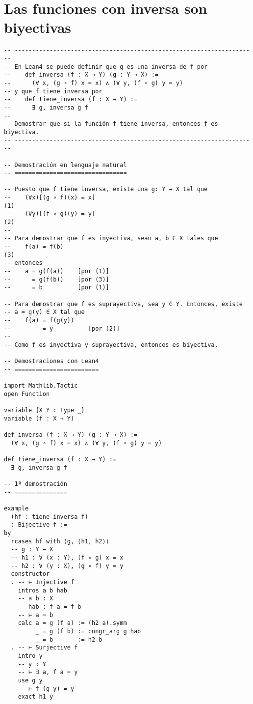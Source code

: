 \section{Las funciones con inversa son biyectivas}
\label{sec:orgbb6a3a1}
\begin{verbatim}
-- ---------------------------------------------------------------------
-- En Lean4 se puede definir que g es una inversa de f por
--    def inversa (f : X → Y) (g : Y → X) :=
--      (∀ x, (g ∘ f) x = x) ∧ (∀ y, (f ∘ g) y = y)
-- y que f tiene inversa por
--    def tiene_inversa (f : X → Y) :=
--      ∃ g, inversa g f
--
-- Demostrar que si la función f tiene inversa, entonces f es biyectiva.
-- ---------------------------------------------------------------------

-- Demostración en lenguaje natural
-- ================================

-- Puesto que f tiene inversa, existe una g: Y → X tal que
--    (∀x)[(g ∘ f)(x) = x]                                           (1)
--    (∀y)[(f ∘ g)(y) = y]                                           (2)
--
-- Para demostrar que f es inyectiva, sean a, b ∈ X tales que
--    f(a) = f(b)                                                    (3)
-- entonces
--    a = g(f(a))    [por (1)]
--      = g(f(b))    [por (3)]
--      = b          [por (1)]
--
-- Para demostrar que f es suprayectiva, sea y ∈ Y. Entonces, existe
-- a = g(y) ∈ X tal que
--    f(a) = f(g(y))
--         = y          [por (2)]
--
-- Como f es inyectiva y suprayectiva, entonces es biyectiva.

-- Demostraciones con Lean4
-- ========================

import Mathlib.Tactic
open Function

variable {X Y : Type _}
variable (f : X → Y)

def inversa (f : X → Y) (g : Y → X) :=
  (∀ x, (g ∘ f) x = x) ∧ (∀ y, (f ∘ g) y = y)

def tiene_inversa (f : X → Y) :=
  ∃ g, inversa g f

-- 1ª demostración
-- ===============

example
  (hf : tiene_inversa f)
  : Bijective f :=
by
  rcases hf with ⟨g, ⟨h1, h2⟩⟩
  -- g : Y → X
  -- h1 : ∀ (x : Y), (f ∘ g) x = x
  -- h2 : ∀ (y : X), (g ∘ f) y = y
  constructor
  . -- ⊢ Injective f
    intros a b hab
    -- a b : X
    -- hab : f a = f b
    -- ⊢ a = b
    calc a = g (f a) := (h2 a).symm
         _ = g (f b) := congr_arg g hab
         _ = b       := h2 b
  . -- ⊢ Surjective f
    intro y
    -- y : Y
    -- ⊢ ∃ a, f a = y
    use g y
    -- ⊢ f (g y) = y
    exact h1 y


\end{verbatim}
